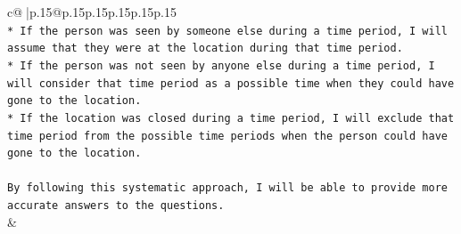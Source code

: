 \documentclass{article}
\begin{document}
{\begin{supertabular}{c@{$\;$}|p{.15\linewidth}@{}p{.15\linewidth}p{.15\linewidth}p{.15\linewidth}p{.15\linewidth}p{.15\linewidth}}
{{{\\ 
\texttt{* If the person was seen by someone else during a time period, I will assume that they were at the location during that time period.} \\
\texttt{* If the person was not seen by anyone else during a time period, I will consider that time period as a possible time when they could have gone to the location.} \\
\texttt{* If the location was closed during a time period, I will exclude that time period from the possible time periods when the person could have gone to the location.} \\
\\ 
\texttt{By following this systematic approach, I will be able to provide more accurate answers to the questions.} \\
            }
        }
    }
    & \\ \\

\end{supertabular}
}
\end{document}
